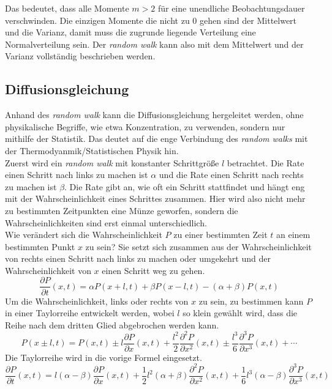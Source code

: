 Das bedeutet, dass alle Momente $m > 2$ für eine unendliche Beobachtungsdauer verschwinden. Die einzigen Momente die nicht zu $0$ gehen sind der Mittelwert und die Varianz, damit muss die zugrunde liegende Verteilung eine Normalverteilung sein. Der \emph{random walk} kann also mit dem Mittelwert und der Varianz vollständig beschrieben werden.

\subsection*{Diffusionsgleichung}
Anhand des \emph{random walk} kann die Diffusionsgleichung hergeleitet werden, ohne physikalische Begriffe, wie etwa Konzentration, zu verwenden, sondern nur mithilfe der Statistik. Das deutet auf die enge Verbindung des \emph{random walks} mit der Thermodyanmik/Statistischen Physik hin.\\
Zuerst wird ein \emph{random walk} mit konstanter Schrittgröße $l$ betrachtet. Die Rate einen Schritt nach links zu machen ist $\alpha$ und die Rate einen Schritt nach rechts zu machen ist $\beta$. Die Rate gibt an, wie oft ein Schritt stattfindet und hängt eng mit der Wahrscheinlichkeit eines Schrittes zusammen. Hier wird also nicht mehr zu bestimmten Zeitpunkten eine Münze geworfen, sondern die Wahrscheinlichkeiten sind erst einmal unterschiedlich.\\ Wie verändert sich die Wahrscheinlichkeit $P$ zu einer bestimmten Zeit $t$ an einem bestimmten Punkt $x$ zu sein? Sie setzt sich zusammen aus der Wahrscheinlichkeit von rechts einen Schritt nach links zu machen oder umgekehrt und der Wahrscheinlichkeit von $x$ einen Schritt weg zu gehen.
\begin{equation}
  \frac{\partial P}{\partial t} (x, t) = \alpha P(x + l, t) + \beta P(x - l, t) - (\alpha + \beta) P(x, t)
\end{equation}
Um die Wahrscheinlichkeit, links oder rechts von $x$ zu sein, zu bestimmen kann $P$ in einer Taylorreihe entwickelt werden, wobei $l$ so klein gewählt wird, dass die Reihe nach dem dritten Glied abgebrochen werden kann.
\begin{equation}
  P(x \pm l, t) = P(x, t) \pm l \frac{\partial P}{\partial x}(x, t) + \frac{l^2}{2} \frac{\partial^2 P}{\partial x^2}(x, t) \pm \frac{l^3}{6} \frac{\partial^3 P}{\partial x^3}(x, t) + \cdots
\end{equation}
Die Taylorreihe wird in die vorige Formel eingesetzt.
\begin{equation}
  \frac{\partial P}{\partial t} (x, t) = l (\alpha - \beta) \frac{\partial P}{\partial x}(x, t) + \frac{1}{2} l^2 (\alpha + \beta) \frac{\partial^2 P}{\partial x^2}(x, t) + \frac{1}{6} l^3 (\alpha - \beta) \frac{\partial^3 P}{\partial x^3}(x, t)
\end{equation}
